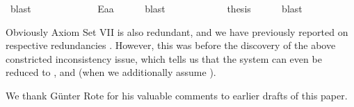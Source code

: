 \begin{isabellebody}
\ blast\ \isanewline
\ \ \ \ %
\ \isanewline
\ \ \ \isamarkupfalse%
\ {}{\isacharcolon}\ {\isachardoublequoteopen}E{\isacharparenleft}{\isacharparenleft}{\isasymbox}a{\isacharparenright}\isactrlbold {\isasymcdot}a{\isacharparenright}{\isachardoublequoteclose}\ \isamarkupfalse%
\ {}\ {}\ \isamarkupfalse%
\ blast\ \isanewline
\ \ \ \ %
\isanewline
\ \ \ \isamarkupfalse%
\ \isamarkupfalse%
\ {\isacharquery}thesis\ \isamarkupfalse%
\ {}\ {}\ \isamarkupfalse%
\ blast\isanewline
\ \ \isamarkupfalse%
%
\endisatagproof
{\isafoldproof}%
%
\isadelimproof
%
\endisadelimproof
%
\begin{isamarkuptext}%
Obviously Axiom Set VII is also redundant, and we have previously reported 
on respective redundancies \cite{C57}. However, this was before the discovery of the above 
constricted inconsistency issue, which tells us that the system can even be reduced 
to ,  and  (when we additionally assume ).%
\end{isamarkuptext}\isamarkuptrue%
%
\isamarkuptrue%
%
\begin{isamarkuptext}%
We thank G\"unter Rote for his valuable comments to earlier drafts of this paper.%
\end{isamarkuptext}\isamarkuptrue%
%
\isadelimtheory
%
\endisadelimtheory
%
\isatagtheory
%
\endisatagtheory
{\isafoldtheory}%
%
\isadelimtheory
%
\endisadelimtheory
%
\end{isabellebody}%
